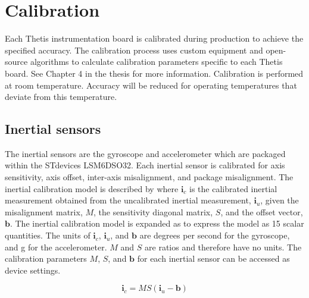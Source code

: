 \section{Calibration}
\label{sec:calibration}

Each Thetis instrumentation board is calibrated during production to achieve the specified accuracy.
The calibration process uses custom equipment and open-source algorithms to calculate calibration parameters specific to each Thetis board.
See Chapter 4 in the thesis for more information.
Calibration is performed at room temperature.
Accuracy will be reduced for operating temperatures that deviate from this temperature.

\subsection{Inertial sensors}
\label{sec:inertialSensor}

The inertial sensors are the gyroscope and accelerometer which are packaged within the STdevices LSM6DSO32.
Each inertial sensor is calibrated for axis sensitivity, axis offset, inter-axis misalignment, and package misalignment.
The inertial calibration model is described by  where $\pmb{i}_c$ is the calibrated inertial measurement obtained from the uncalibrated inertial measurement, $\pmb{i}_u$, given the misalignment matrix, $M$, the sensitivity diagonal matrix, $S$, and the offset vector, $\pmb{b}$.
The inertial calibration model is expanded as  to express the model as 15 scalar quantities.  
The units of $\pmb{i}_c$, $\pmb{i}_u$, and $\pmb{b}$ are degrees per second for the gyroscope, and g for the accelerometer.
$M$ and $S$ are ratios and therefore have no units.  
The calibration parameters $M$, $S$, and $\pmb{b}$ for each inertial sensor can be accessed as device settings.

\begin{equation}
    \label{eq:inertial}
    \pmb{i}_c = M S (\pmb{i}_u - \pmb{b})
\end{equation}

